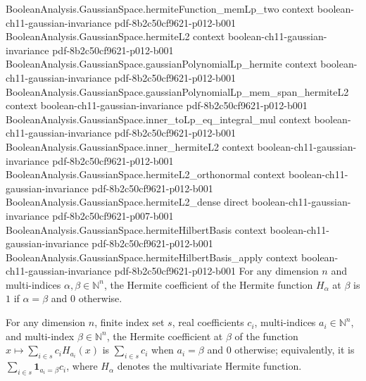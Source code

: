 \begin{lemma}
\proofstep
  {BooleanAnalysis.GaussianSpace.hermiteFunction_memLp_two}
  {context}
  {boolean-ch11-gaussian-invariance}
  {pdf-8b2c50cf9621-p012-b001}
\proofstep
  {BooleanAnalysis.GaussianSpace.hermiteL2}
  {context}
  {boolean-ch11-gaussian-invariance}
  {pdf-8b2c50cf9621-p012-b001}
\proofstep
  {BooleanAnalysis.GaussianSpace.gaussianPolynomialLp_hermite}
  {context}
  {boolean-ch11-gaussian-invariance}
  {pdf-8b2c50cf9621-p012-b001}
\proofstep
  {BooleanAnalysis.GaussianSpace.gaussianPolynomialLp_mem_span_hermiteL2}
  {context}
  {boolean-ch11-gaussian-invariance}
  {pdf-8b2c50cf9621-p012-b001}
\proofstep
  {BooleanAnalysis.GaussianSpace.inner_toLp_eq_integral_mul}
  {context}
  {boolean-ch11-gaussian-invariance}
  {pdf-8b2c50cf9621-p012-b001}
\proofstep
  {BooleanAnalysis.GaussianSpace.inner_hermiteL2}
  {context}
  {boolean-ch11-gaussian-invariance}
  {pdf-8b2c50cf9621-p012-b001}
\proofstep
  {BooleanAnalysis.GaussianSpace.hermiteL2_orthonormal}
  {context}
  {boolean-ch11-gaussian-invariance}
  {pdf-8b2c50cf9621-p012-b001}
\proofstep
  {BooleanAnalysis.GaussianSpace.hermiteL2_dense}
  {direct}
  {boolean-ch11-gaussian-invariance}
  {pdf-8b2c50cf9621-p007-b001}
\proofstep
  {BooleanAnalysis.GaussianSpace.hermiteHilbertBasis}
  {context}
  {boolean-ch11-gaussian-invariance}
  {pdf-8b2c50cf9621-p012-b001}
\proofstep
  {BooleanAnalysis.GaussianSpace.hermiteHilbertBasis_apply}
  {context}
  {boolean-ch11-gaussian-invariance}
  {pdf-8b2c50cf9621-p012-b001}
For any dimension $n$ and multi-indices $\alpha,\beta\in\mathbb N^n$, the Hermite
coefficient of the Hermite function $H_\alpha$ at $\beta$ is $1$ if $\alpha=\beta$ and
$0$ otherwise.
\end{lemma}

\begin{lemma}
\label{BooleanAnalysis.GaussianSpace.hermiteCoeff_finset_sum_hermiteFunction}
\leanok
{}
For any dimension $n$, finite index set $s$, real coefficients $c_i$, multi-indices
$a_i\in\mathbb N^n$, and multi-index $\beta\in\mathbb N^n$, the Hermite coefficient at
$\beta$ of the function $x\mapsto\sum_{i\in s}c_i H_{a_i}(x)$ is $\sum_{i\in s} c_i$
when $a_i=\beta$ and $0$ otherwise; equivalently, it is $\sum_{i\in
s}\mathbf{1}_{a_i=\beta}c_i$, where $H_\alpha$ denotes the multivariate Hermite
function.
\end{lemma}

